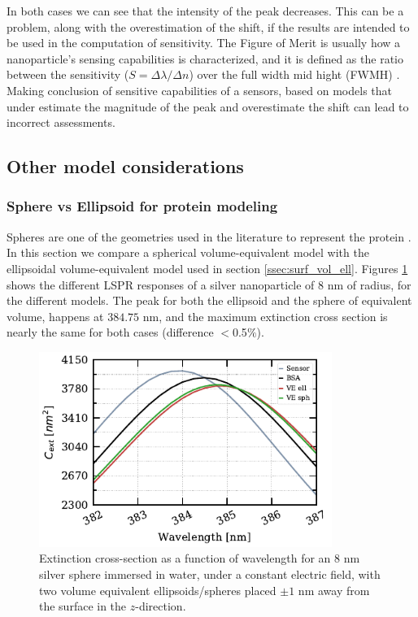 In both cases we can see that the intensity of the peak decreases. This can be a problem, along with the overestimation of the shift,
if the results are intended to be used in the computation of sensitivity. The Figure of Merit is usually how a
nanoparticle's sensing capabilities is characterized, and it is defined as the ratio between the 
sensitivity ($S = \Delta \lambda / \Delta n$) over the full width mid hight (FWMH) \cite{otte2012}. Making 
conclusion of sensitive capabilities of a sensors, based on models that under estimate the magnitude of the peak and 
overestimate the shift can lead to incorrect assessments.

\subsection{Other model considerations}

\subsubsection{Sphere vs Ellipsoid for protein modeling}

Spheres are one of the geometries used in the literature to represent the protein \cite{SantiagoCordobaETal2011, UngerETal2009}. In this 
section we compare a spherical volume-equivalent model with the ellipsoidal volume-equivalent model used in section
\ref{ssec:surf_vol_ell}. Figures \ref{fig:sph_vs_ell_ve} shows the different LSPR responses of a silver nanoparticle of $8$ nm of radius, 
for the different models. The peak for both the ellipsoid and the sphere of equivalent volume, happens at $384.75$ nm, and the 
maximum extinction cross section is nearly the same for both cases (difference $<$0.5$\%$). 


\begin{figure} %
    \centering
    \includegraphics[width=0.85\textwidth]{two_ve_ell_sph_vs_BSA.pdf} 
    \caption{Extinction cross-section as a function of wavelength for an $8$ nm
    silver sphere immersed in water, under a constant electric field, with two volume equivalent 
    ellipsoids/spheres placed $\pm 1$ nm away from the surface in the $z$-direction.}
    \label{fig:sph_vs_ell_ve}
 \end{figure}

